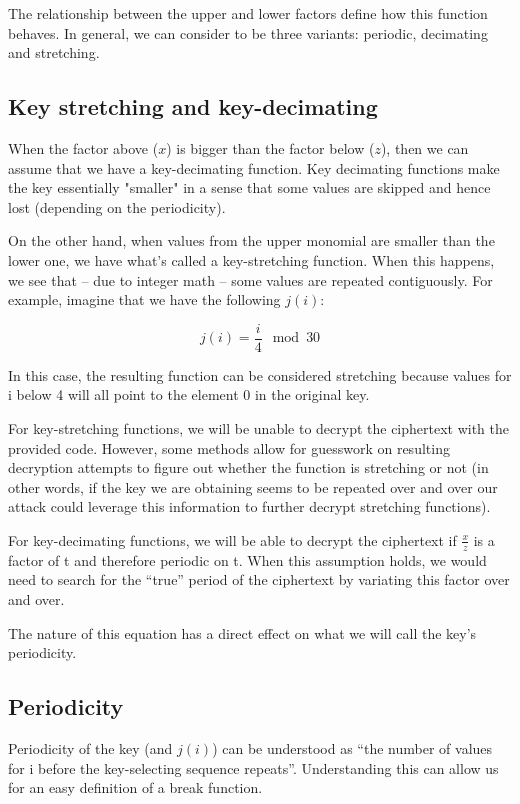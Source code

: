 \documentclass[pdftex,12pt,letter]{article}
\begin{document}
The relationship between the upper and lower factors define how this function
behaves.  In general, we can consider to be three variants: periodic,
decimating and stretching. 

\subsection{Key stretching and key-decimating}

When the factor above ($x$) is bigger than the factor below ($z$), then we can
assume that we have a key-decimating function. Key decimating functions make
the key essentially "smaller" in a sense that some values are skipped and hence
lost (depending on the periodicity).

On the other hand, when values from the upper monomial are smaller than the
lower one, we have what's called a key-stretching function. When this happens,
we see that -- due to integer math -- some values are repeated contiguously.
For example, imagine that we have the following $j(i)$:

\begin{equation}
    j(i) = \frac{i}{4}\mod{30}
\end{equation}

In this case, the resulting function can be considered stretching because
values for i below 4 will all point to the element 0 in the original key.

For key-stretching functions, we will be unable to decrypt the ciphertext with the
provided code. However, some methods allow for guesswork on resulting decryption
attempts to figure out whether the function is stretching or not (in other words, if
the key we are obtaining seems to be repeated over and over our attack could leverage
this information to further decrypt stretching functions).

For key-decimating functions, we will be able to decrypt the ciphertext if
$\frac{x}{z}$ is a factor of t and therefore periodic on t. When this
assumption holds, we would need to search for the ``true'' period of the
ciphertext by variating this factor over and over.

The nature of this equation has a direct effect on what we will call the key's
periodicity.

\subsection{Periodicity}

Periodicity of the key (and $j(i)$) can be understood as ``the number of values for i
before the key-selecting sequence repeats''. Understanding this can allow us for 
an easy definition of a break function. 
\end{document}
